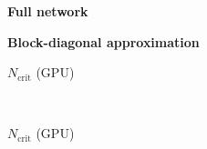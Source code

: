 \begin{table}[tb]
  \vspace{5ex}




  \begin{small}
    \textbf{\cifarten \resnetfiftysix}
  \end{small}

  \begin{minipage}{0.49\linewidth}
    \centering
    \begin{small}
      \textbf{Full network}
    \end{small}
  \end{minipage}
  \hfill
  \begin{minipage}{0.49\linewidth}
    \centering
    \begin{small}
      \textbf{Block-diagonal approximation}
    \end{small}
  \end{minipage}
  \vspace{1ex}

  \begin{minipage}{0.245\linewidth}
    \centering
    \begin{small}
      $N_{\text{crit}}$ (GPU)
    \end{small}
    \vspace{0.15\baselineskip}

    \begin{small}
      
    \end{small}
  \end{minipage}
  \hfill
  \begin{minipage}{0.245\linewidth}
  \textcolor{white}{.}

  \end{minipage}
  \hfill
  \begin{minipage}{0.245\linewidth}
    \centering
    \begin{small}
      $N_{\text{crit}}$ (GPU)
    \end{small}
    \vspace{0.15\baselineskip}


\end{minipage}
\end{table}
